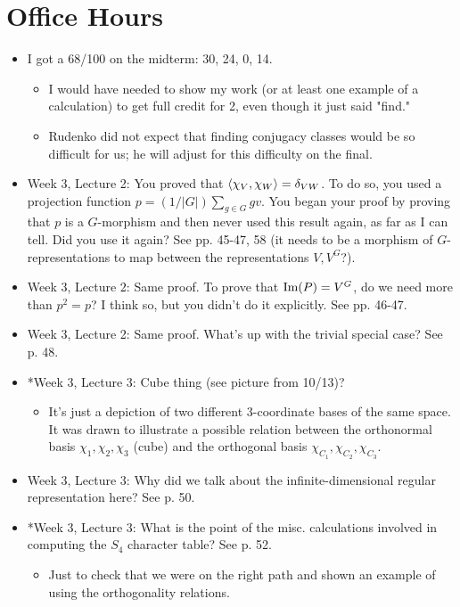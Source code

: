 \documentclass[../notes.tex]{subfiles}
\begin{document}
\section{Office Hours}
\begin{itemize}
    \item I got a 68/100 on the midterm: 30, 24, 0, 14.
    \begin{itemize}
        \item I would have needed to show my work (or at least one example of a calculation) to get full credit for 2, even though it just said "find."
        \item Rudenko did not expect that finding conjugacy classes would be so difficult for us; he will adjust for this difficulty on the final.
    \end{itemize}
    \item Week 3, Lecture 2: You proved that $\left\langle{\chi_V,\chi_W}\right\rangle=\delta_{VW}$. To do so, you used a projection function $p=(1/|G|)\sum_{g\in G}gv$. You began your proof by proving that $p$ is a $G$-morphism and then never used this result again, as far as I can tell. Did you use it again? See pp. 45-47, 58 (it needs to be a morphism of $G$-representations to map between the representations $V,V^G$?).
    \item Week 3, Lecture 2: Same proof. To prove that $\operatorname{Im}(P)=V^G$, do we need more than $p^2=p$? I think so, but you didn't do it explicitly. See pp. 46-47.
    \item Week 3, Lecture 2: Same proof. What's up with the trivial special case? See p. 48.
    \item *Week 3, Lecture 3: Cube thing (see picture from 10/13)?
    \begin{itemize}
        \item It's just a depiction of two different 3-coordinate bases of the same space. It was drawn to illustrate a possible relation between the orthonormal basis $\chi_1,\chi_2,\chi_3$ (cube) and the orthogonal basis $\chi_{C_1},\chi_{C_2},\chi_{C_3}$.
    \end{itemize}
    \item Week 3, Lecture 3: Why did we talk about the infinite-dimensional regular representation here? See p. 50.
    \item *Week 3, Lecture 3: What is the point of the misc. calculations involved in computing the $S_4$ character table? See p. 52.
    \begin{itemize}
        \item Just to check that we were on the right path and shown an example of using the orthogonality relations.

\end{itemize}
\end{itemize}
\end{document}
